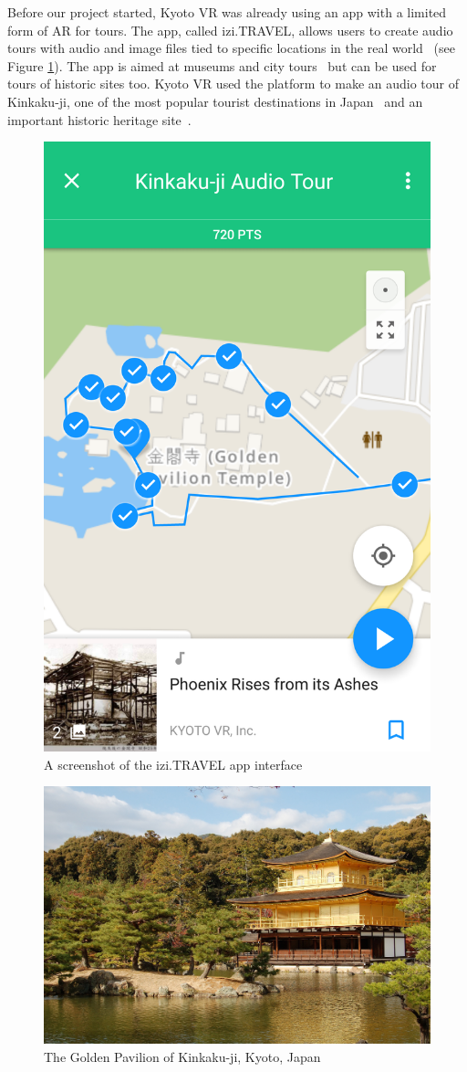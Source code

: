 \documentclass[a4paper, 10pt, american, titlepage]{article}
\begin{document}
Before our project started, Kyoto VR was already using an app with a limited
form of AR for tours. The app, called izi.TRAVEL, allows users to create audio
tours with audio and image files tied to specific locations in the real
world~\autocite{izitravel2015} (see Figure \ref{fig:iziTravel}). The app is
aimed at museums and city tours~\autocite{izitravel} but can be used for tours
of historic sites too.  Kyoto VR used the platform to make an audio tour of
Kinkaku-ji, one of the most popular tourist destinations in
Japan~\autocite{bornoff2000} and an important historic heritage
site~\autocite{unesco}.

\begin{figure}[h]
	\centering
	\includegraphics[width=.5\textwidth]{izi-travel.png}
	\caption{A screenshot of the izi.TRAVEL app interface}
	\label{fig:iziTravel}
\end{figure}

\begin{figure}[h]
	\centering
	\includegraphics[width=\textwidth]{kinkakuji.jpg}
	\caption[The Golden Pavilion of Kinkaku-ji, Kyoto, Japan]{The Golden
		Pavilion of Kinkaku-ji, Kyoto, Japan~\autocite{davidson2005}}
	\label{fig:kinkakuji}
\end{figure}
\end{document}
